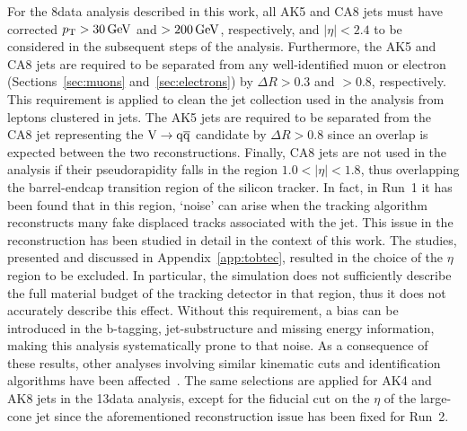 For the 8\TeV data analysis described in this work, all AK5 and CA8 jets must have corrected $p_{\mathrm{T}} > 30\,\text{Ge\hspace{-.08em}V}$ and $> 200\,\text{Ge\hspace{-.08em}V}$, respectively, and $|\eta| < 2.4$ to be considered in the subsequent steps of the analysis.
Furthermore, the AK5 and CA8 jets are required to be separated from any well-identified muon or electron (Sections~\ref{sec:muons} and~\ref{sec:electrons}) by $\Delta R > 0.3$ and $> 0.8$, respectively. This requirement is applied to clean the jet collection used in the analysis from leptons clustered in jets. The AK5 jets are required to be separated from the CA8 jet representing the $\mathrm{V}\to\mathrm{q}\overline{\mathrm{q}}$ candidate by $\Delta R > 0.8$ since an overlap is expected between the two reconstructions. Finally, CA8 jets are not used in the analysis if their pseudorapidity falls in the region $1.0 < |\eta| < 1.8$, thus overlapping the barrel-endcap transition region of the silicon tracker.
In fact, in Run~1 it has been found that in this region, `noise' can arise when the tracking algorithm reconstructs many fake displaced tracks associated with the jet.
This issue in the reconstruction has been studied in detail in the context of this work. The studies, presented and discussed in Appendix~\ref{app:tobtec}, resulted in the choice of the $\eta$ region to be excluded.
In particular, the simulation does not sufficiently describe the full material budget of the tracking detector in that region, thus it does not accurately describe this effect.
Without this requirement, a bias can be introduced in the b-tagging, jet-substructure and missing energy information, making this analysis systematically prone to that noise.
As a consequence of these results, other analyses involving similar kinematic cuts and identification algorithms have been affected~\cite{CMS-PAS-EXO-15-008}.
The same selections are applied for AK4 and AK8 jets in the 13\TeV data analysis, except for the fiducial cut on the $\eta$ of the large-cone jet since the aforementioned reconstruction issue has been fixed for Run~2.
